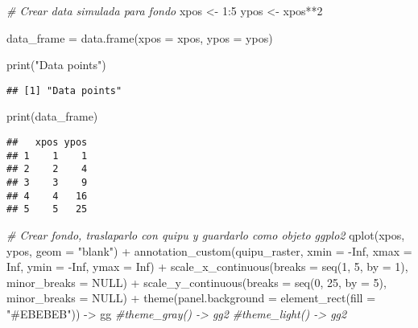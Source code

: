 \documentclass[
]{article}
\newenvironment{Shaded}{\begin{snugshade}}{\end{snugshade}}
\newcommand{\AttributeTok}[1]{\textcolor[rgb]{0.77,0.63,0.00}{#1}}
\newcommand{\CommentTok}[1]{\textcolor[rgb]{0.56,0.35,0.01}{\textit{#1}}}
\newcommand{\ConstantTok}[1]{\textcolor[rgb]{0.00,0.00,0.00}{#1}}
\newcommand{\DecValTok}[1]{\textcolor[rgb]{0.00,0.00,0.81}{#1}}
\newcommand{\FunctionTok}[1]{\textcolor[rgb]{0.00,0.00,0.00}{#1}}
\newcommand{\NormalTok}[1]{#1}
\newcommand{\OtherTok}[1]{\textcolor[rgb]{0.56,0.35,0.01}{#1}}
\newcommand{\SpecialCharTok}[1]{\textcolor[rgb]{0.00,0.00,0.00}{#1}}
\newcommand{\StringTok}[1]{\textcolor[rgb]{0.31,0.60,0.02}{#1}}
\begin{document}
\begin{Shaded}
\begin{Highlighting}[]
\CommentTok{\# Crear data simulada para fondo}
\NormalTok{xpos }\OtherTok{\textless{}{-}} \DecValTok{1}\SpecialCharTok{:}\DecValTok{5}
\NormalTok{ypos }\OtherTok{\textless{}{-}}\NormalTok{ xpos}\SpecialCharTok{**}\DecValTok{2}
  
\NormalTok{data\_frame }\OtherTok{=} \FunctionTok{data.frame}\NormalTok{(}\AttributeTok{xpos =}\NormalTok{ xpos,}
                        \AttributeTok{ypos =}\NormalTok{ ypos)}
  
\FunctionTok{print}\NormalTok{(}\StringTok{"Data points"}\NormalTok{)}
\end{Highlighting}
\end{Shaded}

\begin{verbatim}
## [1] "Data points"
\end{verbatim}

\begin{Shaded}
\begin{Highlighting}[]
\FunctionTok{print}\NormalTok{(data\_frame)}
\end{Highlighting}
\end{Shaded}

\begin{verbatim}
##   xpos ypos
## 1    1    1
## 2    2    4
## 3    3    9
## 4    4   16
## 5    5   25
\end{verbatim}

\begin{Shaded}
\begin{Highlighting}[]
\CommentTok{\# Crear fondo, traslaparlo con quipu y guardarlo como objeto ggplo2}
\FunctionTok{qplot}\NormalTok{(xpos, ypos, }\AttributeTok{geom =} \StringTok{"blank"}\NormalTok{) }\SpecialCharTok{+} 
  \FunctionTok{annotation\_custom}\NormalTok{(quipu\_raster, }
                    \AttributeTok{xmin =} \SpecialCharTok{{-}}\ConstantTok{Inf}\NormalTok{, }
                    \AttributeTok{xmax =} \ConstantTok{Inf}\NormalTok{, }
                    \AttributeTok{ymin =} \SpecialCharTok{{-}}\ConstantTok{Inf}\NormalTok{, }
                    \AttributeTok{ymax =} \ConstantTok{Inf}\NormalTok{) }\SpecialCharTok{+} 
  \FunctionTok{scale\_x\_continuous}\NormalTok{(}\AttributeTok{breaks =} \FunctionTok{seq}\NormalTok{(}\DecValTok{1}\NormalTok{, }\DecValTok{5}\NormalTok{, }\AttributeTok{by =} \DecValTok{1}\NormalTok{), }\AttributeTok{minor\_breaks =} \ConstantTok{NULL}\NormalTok{) }\SpecialCharTok{+}
  \FunctionTok{scale\_y\_continuous}\NormalTok{(}\AttributeTok{breaks =} \FunctionTok{seq}\NormalTok{(}\DecValTok{0}\NormalTok{, }\DecValTok{25}\NormalTok{, }\AttributeTok{by =} \DecValTok{5}\NormalTok{), }\AttributeTok{minor\_breaks =} \ConstantTok{NULL}\NormalTok{) }\SpecialCharTok{+}
  \FunctionTok{theme}\NormalTok{(}\AttributeTok{panel.background =} \FunctionTok{element\_rect}\NormalTok{(}\AttributeTok{fill =} \StringTok{"\#EBEBEB"}\NormalTok{)) }\OtherTok{{-}\textgreater{}}\NormalTok{ gg}
  \CommentTok{\#theme\_gray() {-}\textgreater{} gg2}
  \CommentTok{\#theme\_light() {-}\textgreater{} gg2}
\end{Highlighting}
\end{Shaded}
\end{document}
